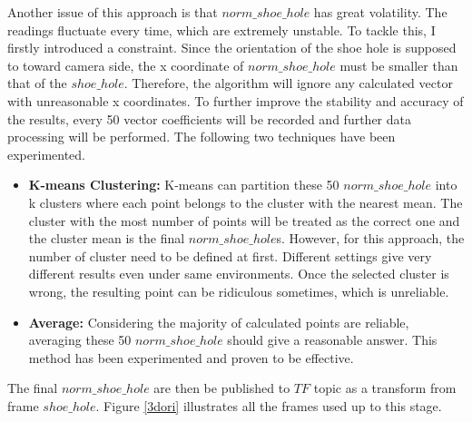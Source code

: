 Another issue of this approach is that $norm\_shoe\_hole$ has great volatility. The readings fluctuate every time, which are extremely unstable. To tackle this, I firstly introduced a constraint. Since the orientation of the shoe hole is supposed to toward camera side, the x coordinate of $norm\_shoe\_hole$ must be smaller than that of the $shoe\_hole$. Therefore, the algorithm will ignore any calculated vector with unreasonable x coordinates. To further improve the stability and accuracy of the results, every 50 vector coefficients will be recorded and further data processing will be performed. The following two techniques have been experimented. 

\begin{itemize}
    \item \textbf{K-means Clustering:} K-means can partition these 50 $norm\_shoe\_hole$ into k clusters where each point belongs to the cluster with the nearest mean. The cluster with the most number of points will be treated as the correct one and the cluster mean is the final $norm\_shoe\_hole$s. However, for this approach, the number of cluster need to be defined at first. Different settings give very different results even under same environments. Once the selected cluster is wrong, the resulting point can be ridiculous sometimes, which is unreliable.
    
    \item \textbf{Average:} Considering the majority of calculated points are reliable, averaging these 50 $norm\_shoe\_hole$ should give a reasonable answer. This method has been experimented and proven to be effective.
\end{itemize}

The final $norm\_shoe\_hole$ are then be published to $TF$ topic as a transform from frame $shoe\_hole$. Figure \ref{3dori} illustrates all the frames used up to this stage.

